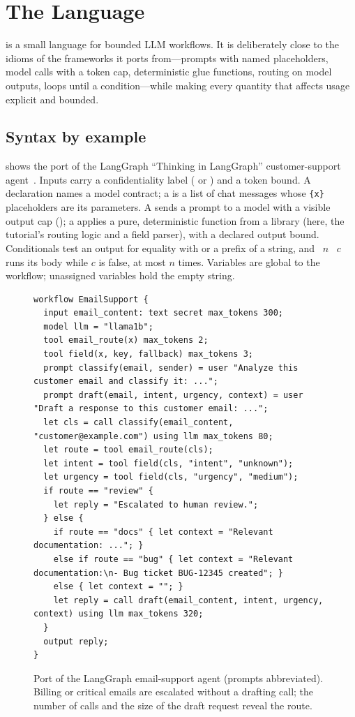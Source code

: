 \section{The \sys Language}\label{sec:language}

\sys is a small language for bounded LLM workflows. It is deliberately close to the idioms of the frameworks it ports from---prompts with named placeholders, model calls with a token cap, deterministic glue functions, routing on model outputs, loops until a condition---while making every quantity that affects usage explicit and bounded.

\subsection{Syntax by example}

 shows the port of the LangGraph ``Thinking in LangGraph'' customer-support agent~\cite{langchaindocs2026}. Inputs carry a confidentiality label ( or ) and a token bound. A  declaration names a model contract; a  is a list of chat messages whose \texttt{\{x\}} placeholders are its parameters. A  sends a prompt to a model with a visible output cap (); a  applies a pure, deterministic function from a library (here, the tutorial's routing logic and a field parser), with a declared output bound. Conditionals test an output for equality with or a prefix of a string, and ~$n$ ~$c$ runs its body while $c$ is false, at most $n$ times. Variables are global to the workflow; unassigned variables hold the empty string.

\begin{figure}[t]
\begin{lstlisting}
workflow EmailSupport {
  input email_content: text secret max_tokens 300;
  model llm = "llama1b";
  tool email_route(x) max_tokens 2;
  tool field(x, key, fallback) max_tokens 3;
  prompt classify(email, sender) = user "Analyze this customer email and classify it: ...";
  prompt draft(email, intent, urgency, context) = user "Draft a response to this customer email: ...";
  let cls = call classify(email_content, "customer@example.com") using llm max_tokens 80;
  let route = tool email_route(cls);
  let intent = tool field(cls, "intent", "unknown");
  let urgency = tool field(cls, "urgency", "medium");
  if route == "review" {
    let reply = "Escalated to human review.";
  } else {
    if route == "docs" { let context = "Relevant documentation: ..."; }
    else if route == "bug" { let context = "Relevant documentation:\n- Bug ticket BUG-12345 created"; }
    else { let context = ""; }
    let reply = call draft(email_content, intent, urgency, context) using llm max_tokens 320;
  }
  output reply;
}
\end{lstlisting}
\caption{Port of the LangGraph email-support agent (prompts abbreviated). Billing or critical emails are escalated without a drafting call; the number of calls and the size of the draft request reveal the route.}
\label{fig:email}
\end{figure}

